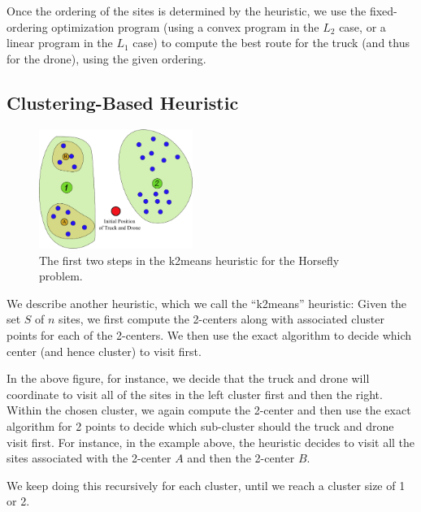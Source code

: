 \documentclass[conference]{IEEEtran}
\newcommand{\old}[1]{{}}
\begin{document}
\old{
  Since the problem of finding an optimal tour of the truck \emph{given}
the ordering of the sites can be solved optimally (using a convex
program in the $L_2$ case, or a linear program in the $L_1$ case), we
can use the ordering obtained from the greedy heuristic to compute a
better tour for the truck than the one obtained during the greedy
algorithm.}

Once the ordering of the sites is determined by the heuristic, we use
the fixed-ordering optimization program (using a convex program in the
$L_2$ case, or a linear program in the $L_1$ case) to compute the best
route for the truck (and thus for the drone), using the given
ordering.

\subsection{Clustering-Based Heuristic}

\begin{figure}[h!]
\centering
\includegraphics[width=5cm]{img/k2means_explain.eps}
\caption{The first two steps in the k2means heuristic for the Horsefly problem.}
\label{fig:k2means_explain}
\end{figure}

We describe another heuristic, which we call the ``k2means''
heuristic: Given the set $S$ of $n$ sites, we first compute the
2-centers along with associated cluster points for each of the
2-centers. We then use the exact algorithm to decide which center (and
hence cluster) to visit first.

In the above figure, for instance, we decide that the truck and drone
will coordinate to visit all of the sites in the left cluster first
and then the right. Within the chosen cluster, we again compute the
2-center and then use the exact algorithm for 2 points to decide which
sub-cluster should the truck and drone visit first. For instance, in
the example above, the heuristic decides to visit all the sites
associated with the 2-center \(A\) and then the
2-center \(B\).

We keep doing this recursively for each cluster, until we reach a
cluster size of 1 or 2.
\end{document}
